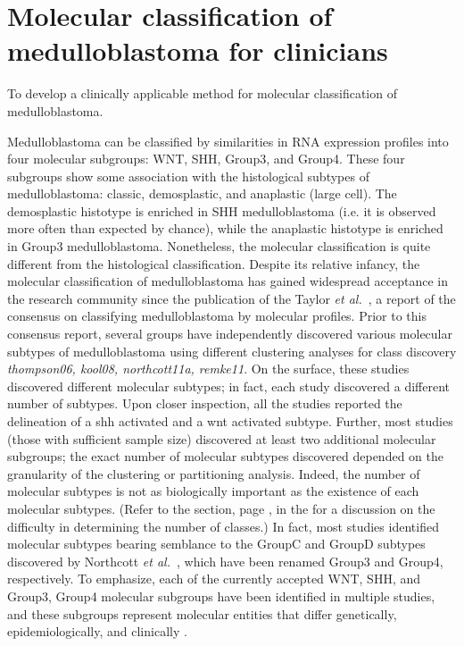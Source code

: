 \chapter{Molecular classification of medulloblastoma for clinicians}
\label{ch:mb-class}

\begin{objective}
To develop a clinically applicable method for molecular classification of medulloblastoma.
\end{objective}

Medulloblastoma can be classified by similarities in RNA expression profiles into four molecular subgroups: WNT, SHH, Group3, and Group4. These four subgroups show some association with the histological subtypes of medulloblastoma: classic, demosplastic, and anaplastic (large cell). The demosplastic histotype is enriched in SHH medulloblastoma (i.e. it is observed more often than expected by chance), while the anaplastic histotype is enriched in Group3 medulloblastoma. Nonetheless, the molecular classification is quite different from the histological classification. Despite its relative infancy, the molecular classification of medulloblastoma has gained widespread acceptance in the research community since the publication of the Taylor \emph{et al.}\ , a report of the consensus on classifying medulloblastoma by molecular profiles. Prior to this consensus report, several groups have independently discovered various molecular subtypes of medulloblastoma using different clustering analyses for class discovery \emph{thompson06, kool08, northcott11a, remke11}. On the surface, these studies discovered different molecular subtypes; in fact, each study discovered a different number of subtypes. Upon closer inspection, all the studies reported the delineation of a \gls{shh} activated and a \gls{wnt} activated subtype. Further, most studies (those with sufficient sample size) discovered at least two additional molecular subgroups; the exact number of molecular subtypes discovered depended on the granularity of the clustering or partitioning analysis. Indeed, the number of molecular subtypes is not as biologically important as the existence of each molecular subtypes. (Refer to the  section, page \pageref{sec:classification}, in the  for a discussion on the difficulty in determining the number of classes.) In fact, most studies identified molecular subtypes bearing semblance to the GroupC and GroupD subtypes discovered by Northcott \emph{et al.}\ , which have been renamed Group3 and Group4, respectively. To emphasize, each of the currently accepted WNT, SHH, and Group3, Group4 molecular subgroups have been identified in multiple studies, and these subgroups represent molecular entities that differ genetically, epidemiologically, and clinically .

